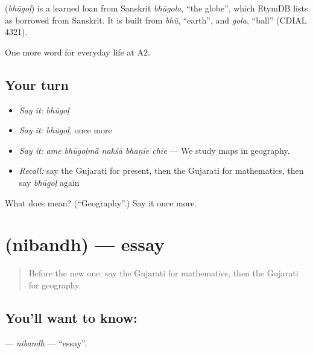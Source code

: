 \begin{cousinweb}
\textbf{} (\emph{bhūgoḷ}) is a learned loan from Sanskrit \emph{bhūgola}, \textquotedblleft{}the globe\textquotedblright{}, which EtymDB lists as borrowed from Sanskrit. It is built from \emph{bhū}, \textquotedblleft{}earth\textquotedblright{}, and \emph{gola}, \textquotedblleft{}ball\textquotedblright{} (CDIAL 4321).
\end{cousinweb}

\begin{grammarlens}[title={What you've built}]
One more word for everyday life at A2.
\end{grammarlens}

\subsection*{Your turn}
\begin{itemize}
\raggedright
  \item \emph{Say it:} \emph{bhūgoḷ}
  \item \emph{Say it:} \emph{bhūgoḷ}, once more
  \item \emph{Say it:} \emph{ame bhūgoḷmā̃ nakśā bhaṇīe chīe} — We study maps in geography.
  \item \emph{Recall:} say the Gujarati for present, then the Gujarati for mathematics, then say \emph{bhūgoḷ} again
\end{itemize}

\begin{tcolorbox}[breakable,colback=teal!4,colframe=teal!35!black,title={Before you move on}]
What does  mean? (\textquotedblleft{}Geography\textquotedblright{}.) Say it once more.
\end{tcolorbox}
\section[\texorpdfstring{\gu{નિબંધ} (nibandh)}{નિબંધ (nibandh)}]{ (nibandh) — essay}

\label{lesson:GU-C244-nibandh}



\begin{quote}
Before the new one: say the Gujarati for mathematics, then the Gujarati for geography.
\end{quote}

\subsection*{You'll want to know: }
\textbf{} — \emph{nibandh} — \textquotedblleft{}essay\textquotedblright{}.

